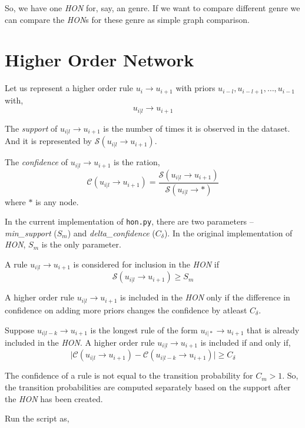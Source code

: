 \documentclass[]{article}
\begin{document}
So, we have one \textit{HON} for, say, an genre. If we want to compare different genre we can compare the \textit{HON}s for these genre as simple graph comparison.

\section{Higher Order Network}

Let us represent a higher order rule $u_i \rightarrow u_{i+1}$ with priors $u_{i-l}, u_{i-l+1}, \ldots, u_{i-1}$ with,
\[
u_{i\vert l} \rightarrow u_{i+1}
\]

The \textit{support} of $u_{i\vert l} \rightarrow u_{i+1}$ is the number of times it is observed in the dataset. And it is represented by $\mathcal{S}\left(u_{i\vert l} \rightarrow u_{i+1}\right)$.

The \textit{confidence} of $u_{i\vert l} \rightarrow u_{i+1}$ is the ration,
\[
\mathcal{C}\left(u_{i\vert l} \rightarrow u_{i+1}\right) = \frac{\mathcal{S}\left(u_{i\vert l} \rightarrow u_{i+1}\right)}{\mathcal{S}\left(u_{i\vert l} \rightarrow \ast\right)}
\]
where $\ast$ is any node.

In the current implementation of \texttt{hon.py}, there are two parameters -- \textit{min\_support} ($S_m$) and \textit{delta\_confidence} ($C_\delta$). In the original implementation of \textit{HON}, $S_m$ is the only parameter.

A rule $u_{i\vert l} \rightarrow u_{i+1}$ is considered for inclusion in the \textit{HON} if
\[
\mathcal{S}\left(u_{i\vert l} \rightarrow u_{i+1}\right) \ge S_m
\]

A higher order rule $u_{i\vert l} \rightarrow u_{i+1}$ is included in the \textit{HON} only if the difference in confidence on adding more priors changes the confidence by atleast $C_\delta$. 

Suppose $u_{i\vert l-k} \rightarrow u_{i+1}$ is the longest rule of the form $u_{i\vert \ast} \rightarrow u_{i+1}$ that is already included in the \textit{HON}. A higher order rule $u_{i\vert l} \rightarrow u_{i+1}$ is included if and only if,
\[
\vert\mathcal{C}\left(u_{i\vert l} \rightarrow u_{i+1}\right) - \mathcal{C}\left(u_{i\vert l-k} \rightarrow u_{i+1}\right)\vert \ge C_\delta
\]

The confidence of a rule is not equal to the transition probability for $C_m > 1$. So, the transition probabilities are computed separately based on the support after the \textit{HON} has been created.

Run the script as,
\end{document}
